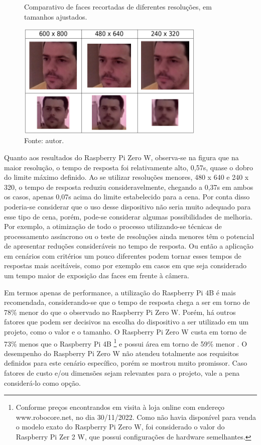 \begin{figure}[h]
    \centering
    \caption[Comparativo de faces recortadas de diferentes resoluções, em tamanhos ajustados.]{Comparativo de faces recortadas de diferentes resoluções, em tamanhos ajustados.}
    \includegraphics[width=0.8\textwidth]{Cap4_Experimentos_Realizados/Figures/cena2_comparativo_qualidade_faces_recortadas_tamanho_proporcional.jpg}
    \caption*{Fonte: autor.}
    \label{fig:cena2_comparativo_qualidade_faces_tamanho_proporcional}
\end{figure}

Quanto aos resultados do Raspberry Pi Zero W, observa-se na figura \label{fig:cena2_graficos_variacao_resolucao} que na maior resolução, o tempo de resposta foi relativamente alto, 0,57s, quase o dobro do limite máximo definido. Ao se utilizar resoluções menores, 480 x 640 e 240 x 320, o tempo de resposta reduziu consideravelmente, chegando a 0,37s em ambos os casos, apenas 0,07s acima do limite estabelecido para a cena. Por conta disso poderia-se considerar que o uso desse dispositivo não seria muito adequado para esse tipo de cena, porém, pode-se considerar algumas possibilidades de melhoria. Por exemplo, a otimização de todo o processo utilizando-se técnicas de processamento assíncrono ou o teste de resoluções ainda menores têm o potencial de apresentar reduções consideráveis no tempo de resposta. Ou então a aplicação em cenários com critérios um pouco diferentes podem tornar esses tempos de respostas mais aceitáveis, como por exemplo em casos em que seja considerado um tempo maior de exposição das faces em frente à câmera.

Em termos apenas de performance, a utilização do Raspberry Pi 4B é mais recomendada, considerando-se que o tempo de resposta chega a ser em torno de 78\% menor do que o observado no Raspberry Pi Zero W. Porém, há outros fatores que podem ser decisivos na escolha do dispositivo a ser utilizado em um projeto, como o valor e o tamanho. O Raspberry Pi Zero W custa em torno de 73\% menos que o Raspberry Pi 4B \footnote{Conforme preços encontrandos em visita à loja online com endereço www.robocore.net, no dia 30/11/2022. Como não havia disponível para venda o modelo exato do Raspberry Pi Zero W, foi considerado o valor do Raspberry Pi Zer 2 W, que possui configurações de hardware semelhantes.} e possui área em torno de 59\% menor . O desempenho do Raspberry Pi Zero W não atendeu totalmente aos requisitos definidos para este cenário específico, porém se mostrou muito promissor. Caso fatores de custo e/ou dimensões sejam relevantes para o projeto, vale a pena considerá-lo como opção.

